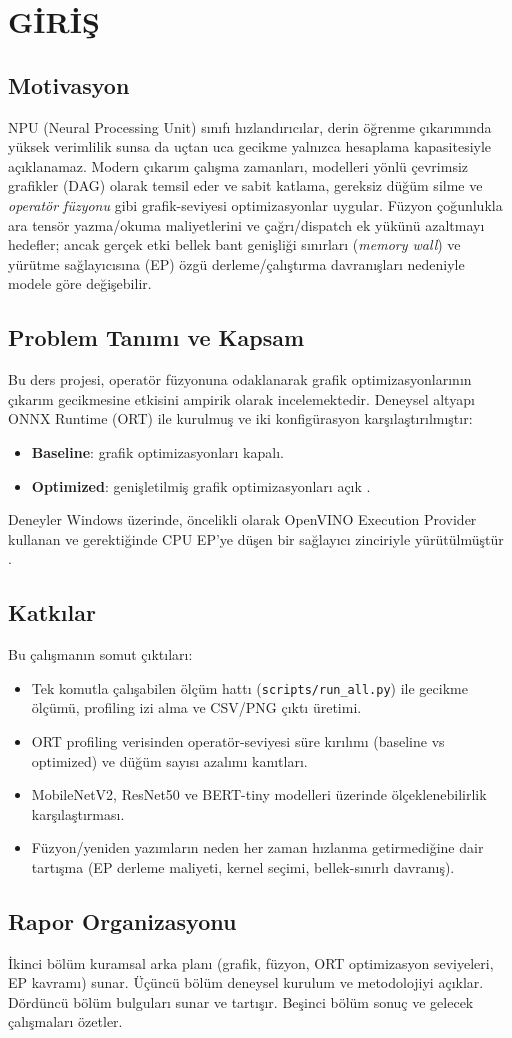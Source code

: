 \chapter{GİRİŞ}\label{sec:intro}

\section{Motivasyon}
NPU (Neural Processing Unit) sınıfı hızlandırıcılar, derin öğrenme çıkarımında yüksek verimlilik sunsa da uçtan uca gecikme yalnızca hesaplama kapasitesiyle açıklanamaz.
Modern çıkarım çalışma zamanları, modelleri yönlü çevrimsiz grafikler (DAG) olarak temsil eder ve sabit katlama, gereksiz düğüm silme ve \textit{operatör füzyonu} gibi grafik-seviyesi optimizasyonlar uygular.
Füzyon çoğunlukla ara tensör yazma/okuma maliyetlerini ve çağrı/dispatch ek yükünü azaltmayı hedefler; ancak gerçek etki bellek bant genişliği sınırları (\textit{memory wall}) \cite{memorywall} ve yürütme sağlayıcısına (EP) özgü derleme/çalıştırma davranışları nedeniyle modele göre değişebilir.

\section{Problem Tanımı ve Kapsam}
Bu ders projesi, operatör füzyonuna odaklanarak grafik optimizasyonlarının çıkarım gecikmesine etkisini ampirik olarak incelemektedir.
Deneysel altyapı ONNX Runtime (ORT) ile kurulmuş ve iki konfigürasyon karşılaştırılmıştır:
\begin{itemize}
  \item \textbf{Baseline}: grafik optimizasyonları kapalı.
  \item \textbf{Optimized}: genişletilmiş grafik optimizasyonları açık \cite{onnxruntime}.
\end{itemize}
Deneyler Windows üzerinde, öncelikli olarak OpenVINO Execution Provider kullanan ve gerektiğinde CPU EP'ye düşen bir sağlayıcı zinciriyle yürütülmüştür \cite{openvino_ep}.

\section{Katkılar}
Bu çalışmanın somut çıktıları:
\begin{itemize}
  \item Tek komutla çalışabilen ölçüm hattı (\texttt{scripts/run\_all.py}) ile gecikme ölçümü, profiling izi alma ve CSV/PNG çıktı üretimi.
  \item ORT profiling verisinden operatör-seviyesi süre kırılımı (baseline vs optimized) ve düğüm sayısı azalımı kanıtları.
  \item MobileNetV2, ResNet50 ve BERT-tiny modelleri üzerinde ölçeklenebilirlik karşılaştırması.
  \item Füzyon/yeniden yazımların neden her zaman hızlanma getirmediğine dair tartışma (EP derleme maliyeti, kernel seçimi, bellek-sınırlı davranış).
\end{itemize}

\section{Rapor Organizasyonu}
İkinci bölüm kuramsal arka planı (grafik, füzyon, ORT optimizasyon seviyeleri, EP kavramı) sunar.
Üçüncü bölüm deneysel kurulum ve metodolojiyi açıklar.
Dördüncü bölüm bulguları sunar ve tartışır.
Beşinci bölüm sonuç ve gelecek çalışmaları özetler.

